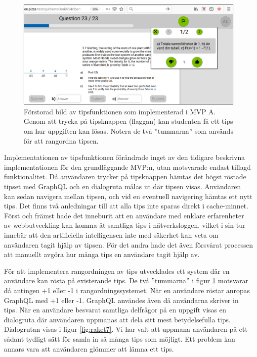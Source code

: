 \begin{figure}[hbtp]
    \centering
    \includegraphics[width=1.0\textwidth]{images/resultpictures/tipsfunktion5.png}
    \caption{Förstorad bild av tipsfunktionen som implementerad i MVP A. Genom att trycka på tipsknappen (flaggan) kan studenten få ett tips om hur uppgiften kan lösas. Notera de två ''tummarna'' som används för att rangordna tipsen.}
    \label{fig:raket6}
\end{figure}


Implementationen av tipsfunktionen förändrade inget av den tidigare beskrivna implementationen för den grundläggande MVP:n, utan motsvarade endast tillagd funktionalitet. Då användaren trycker på tipsknappen hämtas det högst röstade tipset med GraphQL och en dialogruta målas ut där tipsen visas. Användaren kan sedan navigera mellan tipsen, och vid en eventuell navigering hämtas ett nytt tips. Det finns två anledningar till att alla tips inte sparas direkt i cache-minnet. Först och främst hade det inneburit att en användare med enklare erfarenheter av webbutveckling kan komma åt samtliga tips i nätverksloggen, vilket i sin tur innebär att den artificiella intelligensen inte med säkerhet kan veta om användaren tagit hjälp av tipsen. För det andra hade det även försvårat processen att manuellt avgöra hur många tips en användare tagit hjälp av.

För att implementera rangordningen av tips utvecklades ett system där en användare kan rösta på existerande tips. De två ''tummarna'' i figur \ref{fig:raket6} motsvarar då antingen +1 eller -1 i rangordningssystemet. När en användare röstar anropas GraphQL med +1 eller -1. GraphQL användes även då användarna skriver in tips. När en användare besvarat samtliga delfrågor på en uppgift visas en dialogruta där användaren uppmanas att dela sitt mest betydelsefulla tips. Dialogrutan visas i figur \ref{fig:raket7}. Vi har valt att uppmana användaren på ett sådant tydligt sätt för samla in så många tips som möjligt. Ett problem kan annars vara att användaren glömmer att lämna ett tips.

